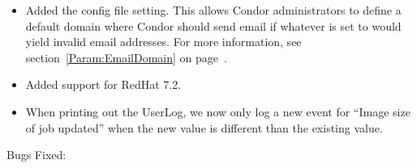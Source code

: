 \begin{itemize}
\item Added the  config file setting.
This allows Condor administrators to define a default domain where
Condor should send email if whatever  is set to
would yield invalid email addresses.
For more information, see section~\ref{Param:EmailDomain} on
page~\pageref{Param:EmailDomain}.

\item
Added support for RedHat 7.2.

\item When printing out the UserLog, we now only log a new event for
``Image size of job updated'' when the new value is different than the
existing value.

\end{itemize}

\noindent Bugs Fixed:

